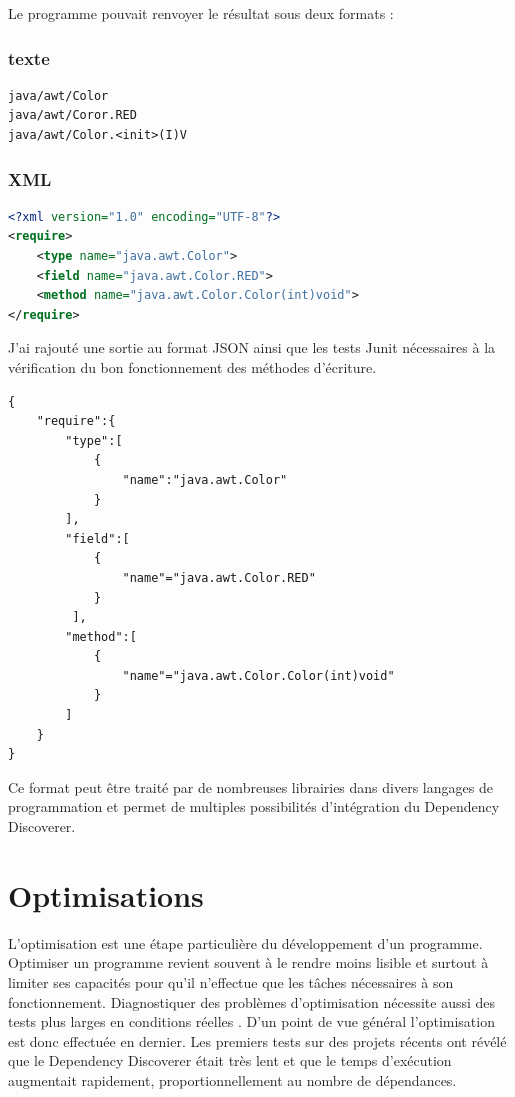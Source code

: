 \documentclass[french,a4paper,12pt]{report}
\begin{document}
Le programme pouvait renvoyer le résultat sous deux formats :

\subsubsection{texte}

\begin{lstlisting}
java/awt/Color
java/awt/Coror.RED
java/awt/Color.<init>(I)V
\end{lstlisting}

\subsubsection{XML}

\begin{lstlisting}[language=xml]
<?xml version="1.0" encoding="UTF-8"?>
<require>
	<type name="java.awt.Color">
	<field name="java.awt.Color.RED">
	<method name="java.awt.Color.Color(int)void">
</require>
\end{lstlisting}



J'ai rajouté une sortie au format JSON ainsi que les tests Junit nécessaires à la vérification du bon fonctionnement des méthodes d'écriture.

\begin{lstlisting}
{
	"require":{
		"type":[ 
			{
				"name":"java.awt.Color"
			}
		],
		"field":[
			{
		 		"name"="java.awt.Color.RED"
		 	}
		 ],
		"method":[
			{
				"name"="java.awt.Color.Color(int)void"
			}
		]
	}
}
\end{lstlisting}

Ce format peut être traité par de nombreuses librairies dans divers langages de programmation et permet de multiples possibilités d'intégration du Dependency Discoverer.


\section{Optimisations}

L’optimisation est une étape particulière du développement d’un programme. Optimiser un programme revient souvent à le rendre moins lisible et surtout à limiter ses capacités pour qu’il n’effectue que les tâches nécessaires à son fonctionnement. Diagnostiquer des problèmes d’optimisation nécessite aussi des tests plus larges en conditions réelles . D’un point de vue général l'optimisation est donc effectuée en dernier. 
Les premiers tests sur des projets récents ont révélé que le Dependency Discoverer était très lent et que le temps d’exécution augmentait rapidement, proportionnellement au nombre de dépendances. 
\end{document}
